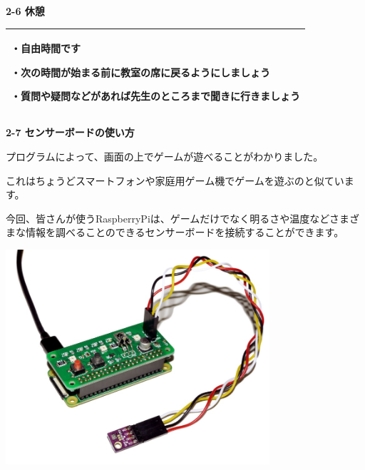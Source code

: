 \documentclass[a4paper,dvipdfmx]{jarticle}
\newcommand\textstyleqwerty[1]{#1}
\begin{document}
\bigskip


\bigskip


\bigskip


\bigskip


\bigskip


\bigskip


\bigskip


\bigskip


\bigskip


\bigskip

{\bfseries
2-6 休憩}


\bigskip

\begin{flushleft}
\tablefirsthead{}
\tablehead{}
\tabletail{}
\tablelasttail{}
\begin{supertabular}{|m{10.733cm}|}
\hline
・自由時間です

・次の時間が始まる前に教室の席に戻るようにしましょう

・質問や疑問などがあれば先生のところまで聞きに行きましょう\\\hline
\end{supertabular}
\end{flushleft}
\clearpage
\textstyleqwerty{\textbf{2-7 センサーボードの使い方}}


\bigskip

プログラムによって、画面の上でゲームが遊べることがわかりました。

これはちょうどスマートフォンや家庭用ゲーム機でゲームを遊ぶのと似ています。

今回、皆さんが使うRaspberryPiは、ゲームだけでなく明るさや温度などさまざまな情報を調べることのできるセンサーボードを接続することができます。



\begin{center}
\includegraphics[width=9.79cm,height=7.955cm]{text02-img/text02-img021.jpg}

\end{center}
\end{document}
